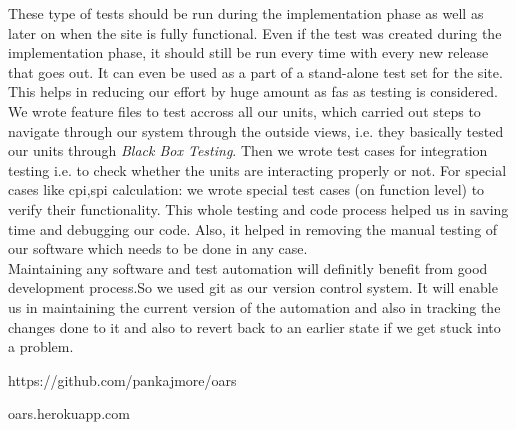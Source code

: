 \documentclass[letterpaper,12pt]{article}
\begin{document}
These type of tests should be run during the implementation phase as well as later on when the site is fully functional. Even if the test was created during the implementation phase, it should still be run every time with every new release that goes out. It can even be used as a part of a stand-alone test set for the site. This helps in reducing our effort by huge amount as fas as testing is considered. We wrote feature files to test accross all our units, which carried out steps to navigate through our system through the outside views, i.e. they basically tested our units through \emph{Black Box Testing}. Then we wrote test cases for integration testing i.e. to check whether the units are interacting properly or not. For special cases like cpi,spi calculation: we wrote special test cases (on function level) to verify their functionality. This whole testing and code process helped us in saving time and debugging our code. Also, it helped in removing the manual testing of our software which needs to be done in any case.\\
Maintaining any software and test automation will definitly benefit from good development process.So we used git as our version control system. It will enable us in maintaining the current version of the automation and also in tracking the changes done to it and also to revert back to an earlier state if we get stuck into a problem.

\begin{thebibliography}{9}

  https://github.com/pankajmore/oars

  oars.herokuapp.com

\end{thebibliography}
\end{document}
